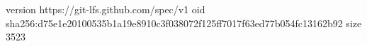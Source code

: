 version https://git-lfs.github.com/spec/v1
oid sha256:d75e1e20100535b1a19e8910c3f038072f125ff7017f63ed77b054fc13162b92
size 3523
